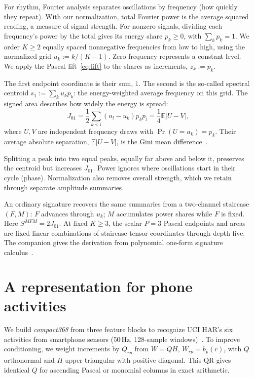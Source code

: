 \documentclass[a4paper]{esannV2}
\begin{document}
For rhythm, Fourier analysis separates oscillations by frequency (how quickly
they repeat). With our normalization, total Fourier power
is the average squared reading, a measure of signal strength.
For nonzero signals, dividing each frequency's power by the total gives its energy
share $p_k\geq0$, with $\sum_k p_k=1$. We order $K\geq2$ equally spaced
nonnegative frequencies from low to high, using the normalized grid
$u_k:=k/(K-1)$. Zero frequency represents a constant level. We apply the Pascal
lift~\eqref{eq:lift} to the shares as increments, $z_k:=p_k$.

The first endpoint coordinate is their sum, $1$. The second is the
so-called spectral centroid $s_1:=\sum_k u_kp_k$: the energy-weighted average frequency
on this grid. The signed area describes how widely the energy is spread:
\begin{equation}
 J_{01}=\frac12\sum_{k<l}(u_l-u_k)p_kp_l
       =\frac14\mathbb E|U-V|,
 \label{eq:spectrum}
\end{equation}
where $U,V$ are independent frequency draws with $\Pr(U=u_k)=p_k$.
Their average absolute separation, $\mathbb E|U-V|$, is the Gini mean
difference~\cite{gini}.

Splitting a peak into two equal peaks, equally far above
and below it, preserves the centroid but increases $J_{01}$. Power ignores
where oscillations start in their cycle (phase). Normalization also removes
overall strength, which we retain through separate amplitude summaries.

An ordinary signature recovers the same summaries from a two-channel staircase
$(F,M)$: $F$ advances through $u_k$; $M$ accumulates power shares while
$F$ is fixed. Here $S^{MFM}=2J_{01}$. At fixed $K\geq3$, the scalar $P=3$
Pascal endpoints and areas are fixed linear combinations of staircase tensor
coordinates through depth five. The companion gives the derivation from
polynomial one-form signature calculus~\cite[Lem.~4.1]{polynomialoneforms}.

\section{A representation for phone activities}
We build \emph{compact368} from three feature blocks to recognize
UCI HAR's six activities from smartphone sensors (50\,Hz, 128-sample
windows)~\cite{har}. To improve conditioning, we weight increments by $Q_{rp}$
from $W=QH$, $W_{rp}=b_p(r)$, with $Q$ orthonormal and $H$ upper triangular
with positive diagonal. This QR gives identical $Q$ for ascending Pascal or
monomial columns in exact arithmetic.
\end{document}
